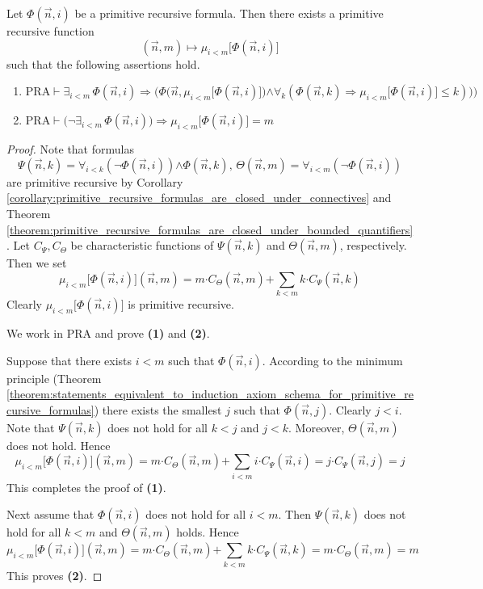 \documentclass[10pt]{amsart}
\newcommand{\mforall}{\boldsymbol{\forall}}
\newcommand{\mexists}{\boldsymbol{\exists}}
\newcommand{\mra}{\boldsymbol{\Rightarrow}}
\newcommand{\mand}{\boldsymbol{\wedge}}
\newcommand{\mneg}{\boldsymbol{\neg}}
\newcommand{\mle}{\boldsymbol{<}}
\newcommand{\mleq}{\boldsymbol{\leq}}
\newcommand{\meq}{\boldsymbol{=}}
\newcommand{\mplus}{\boldsymbol{+}}
\newcommand{\mdot}{\boldsymbol{\cdot}}
\begin{document}
\begin{theorem}\label{theorem:existence_of_bounded_minimum_for_primitive_recursive_formula}
	Let $\Phi(\vec{n},i)$ be a primitive recursive formula. Then there exists a primitive recursive function
	$$(\vec{n},m) \mapsto \mu_{i \mle m}\big[\Phi(\vec{n},i)\big]$$
	such that the following assertions hold.
	\begin{enumerate}[label=\emph{\textbf{(\arabic*)}}]
		\item	$\mathrm{PRA}\vdash \mexists_{i \mle m}\,\Phi(\vec{n},i) \mra \bigg(\Phi\big(\vec{n},\mu_{i \mle m}\big[\Phi(\vec{n},i)\big]\big) \mand \mforall_{k}\left(\Phi(\vec{n},k) \mra \mu_{i \mle m}\big[\Phi(\vec{n},i)\big]\mleq k\right)\big)\bigg)$
		\item $\mathrm{PRA}\vdash \bigg(\mneg \mexists_{i \mle m}\,\Phi(\vec{n},i)\bigg) \mra \mu_{i \mle m}\big[\Phi(\vec{n},i)\big] \meq m$
	\end{enumerate}
\end{theorem}
\begin{proof}
	Note that formulas
	$$\Psi(\vec{n},k) \meq \mforall_{i \mle k}\left(\mneg \Phi(\vec{n},i)\right) \mand \Phi(\vec{n},k),\,\Theta(\vec{n},m) \meq \mforall_{i \mle m}\left(\mneg \Phi(\vec{n},i)\right)$$
	are primitive recursive by Corollary \ref{corollary:primitive_recursive_formulas_are_closed_under_connectives} and Theorem \ref{theorem:primitive_recursive_formulas_are_closed_under_bounded_quantifiers}. Let $C_{\Psi},C_{\Theta}$ be characteristic functions of $\Psi(\vec{n},k)$ and $\Theta(\vec{n},m)$, respectively. Then we set
	$$\mu_{i \mle m}\big[\Phi(\vec{n},i)\big](\vec{n},m) \meq m\mdot C_{\Theta}(\vec{n},m) \mplus \sum_{k \mle m}k\mdot C_{\Psi}(\vec{n},k)$$
	Clearly $\mu_{i \mle m}\big[\Phi(\vec{n},i)\big]$ is primitive recursive.

	We work in $\mathrm{PRA}$ and prove \textbf{(1)} and \textbf{(2)}.

	Suppose that there exists $i \mle m$ such that $\Phi(\vec{n},i)$. According to the minimum principle (Theorem \ref{theorem:statements_equivalent_to_induction_axiom_schema_for_primitive_recursive_formulas}) there exists the smallest $j$ such that $\Phi(\vec{n},j)$. Clearly $j \mle i$. Note that $\Psi(\vec{n},k)$ does not hold for all $k \mle j$ and $j \mle k$. Moreover, $\Theta(\vec{n},m)$ does not hold. Hence
	$$\mu_{i \mle m}\big[\Phi(\vec{n},i)\big](\vec{n},m) \meq m\mdot C_{\Theta}(\vec{n},m) \mplus \sum_{i \mle m}i\mdot C_{\Psi}(\vec{n},i) \meq j\mdot C_{\Psi}(\vec{n},j) \meq j$$
	This completes the proof of \textbf{(1)}.

	Next assume that $\Phi(\vec{n},i)$ does not hold for all $i \mle m$. Then $\Psi(\vec{n},k)$ does not hold for all $k \mle m$ and $\Theta(\vec{n},m)$ holds. Hence
	$$\mu_{i \mle m}\big[\Phi(\vec{n},i)\big](\vec{n},m) \meq m\mdot C_{\Theta}(\vec{n},m) \mplus \sum_{k \mle m}k\mdot C_{\Psi}(\vec{n},k) \meq m\mdot C_{\Theta}(\vec{n},m) \meq m$$
	This proves \textbf{(2)}.
\end{proof}
\end{document}
